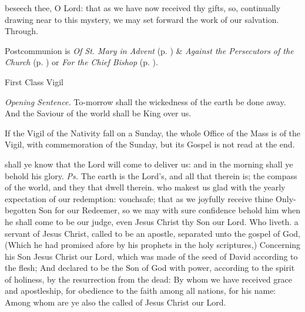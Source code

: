 \postcommunion
{} beseech thee, O Lord: that as we have now received thy gifts, so, continually drawing near to this mystery, we may set forward the work of our salvation. Through.
\begin{rubric}
     Postcommunion is \emph{Of St. Mary in Advent} (p. \pageref{SPMaryInAdvent}) \&  \emph{Against the Persecutors of the Church} (p. \pageref{SPAgainst}) or \emph{For the Chief Bishop} (p. \pageref{SPChiefBishop}).
\end{rubric}

\begin{inhead}
{First Class Vigil}
\end{inhead}
\par\noindent
\textit{Opening Sentence.} To-morrow shall the wickedness of the earth be done away. And the Saviour of the world shall be King over us.\par
{}
\begin{rubric}
    If the Vigil of the Nativity fall on a Sunday, the whole Office of the Mass is of the Vigil, with commemoration of the Sunday, but its Gospel is not read at the end.
\end{rubric}

\introit
{} shall ye know that the Lord will come to deliver us: and in the morning shall ye behold his glory. \textit{Ps.} The earth is the Lord's, and all that therein is; the compass of the world, and they that dwell therein.
\collect
{} who makest us glad with the yearly expectation of our redemption: vouchsafe; that as we joyfully receive thine Only-begotten Son for our Redeemer, so we may with sure confidence behold him when he shall come to be our judge, even Jesus Christ thy Son our Lord. Who liveth.
 a servant of Jesus Christ, called to be an apostle, separated unto the gospel of God, (Which he had promised afore by his prophets in the holy scriptures,) Concerning his Son Jesus Christ our Lord, which was made of the seed of David according to the flesh; And declared to be the Son of God with power, according to the spirit of holiness, by the resurrection from the dead: By whom we have received grace and apostleship, for obedience to the faith among all nations, for his name: Among whom are ye also the called of Jesus Christ our Lord.

